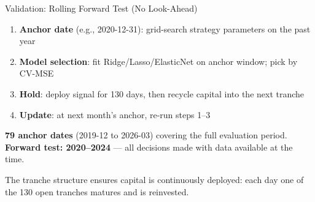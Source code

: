 \documentclass[aspectratio=169]{beamer}
\begin{document}
\begin{frame}{Validation: Rolling Forward Test (No Look-Ahead)}

  \begin{center}
  \end{center}

  \vspace{0.3em}
  \begin{enumerate}
    \item \textbf{Anchor date} (e.g., 2020-12-31): grid-search strategy parameters on the past year
    \item \textbf{Model selection}: fit Ridge/Lasso/ElasticNet on anchor window; pick by CV-MSE
    \item \textbf{Hold}: deploy signal for 130 days, then recycle capital into the next tranche
    \item \textbf{Update}: at next month's anchor, re-run steps 1--3
  \end{enumerate}

  \vspace{0.4em}
  \textbf{79 anchor dates} (2019-12 to 2026-03) covering the full evaluation period.\\
  \textbf{Forward test: 2020--2024} --- all decisions made with data available at the time.

  \vspace{0.3em}
  \begin{block}{}
    \small
    The tranche structure ensures capital is continuously deployed:
    each day one of the 130 open tranches matures and is reinvested.
  \end{block}

\end{frame}
\end{document}
